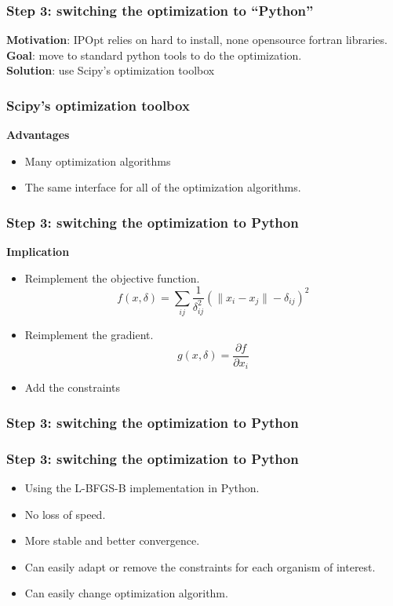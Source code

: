 \documentclass[xcolor=dvipsnames]{beamer}
\begin{document}
\begin{frame}
\frametitle{Step 3: switching the optimization to ``Python''}

{\bf \color{Blue} Motivation}: IPOpt relies on hard to install, none opensource
fortran libraries. 
\vspace{2em}
\\
{\bf \color{Blue} Goal}: move to standard python tools to do the optimization.
\vspace{2em}
\\
{\bf \color{Blue} Solution}: use Scipy's optimization toolbox 
\end{frame}

\begin{frame}
\frametitle{Scipy's optimization toolbox}

{\bf\color{Blue} Advantages} \\
\begin{itemize}[label={$\bullet$}]
\item Many optimization algorithms
\item The same interface for all of the optimization algorithms.
\end{itemize}

{

}
\end{frame}

\begin{frame}
\frametitle{Step 3: switching the optimization to Python}
{\bf\color{Blue} Implication}
\begin{itemize}[label={$\bullet$}]
\item Reimplement the objective function.
$$
f(x, \delta) = \underset{ij}{\sum}\frac{1}{\delta_{ij}^2} (\|x_i - x_j\| - \delta_{ij})^2
$$
\item Reimplement the gradient.
$$
g(x, \delta) = \frac{\partial f}{\partial x_i}
$$
\item Add the constraints
\end{itemize}
\end{frame}

\begin{frame}
\frametitle{Step 3: switching the optimization to Python}

{

}

\end{frame}

\begin{frame}
\frametitle{Step 3: switching the optimization to Python}

\begin{itemize}[label={$\bullet$}]
\item Using the L-BFGS-B implementation in Python.
\item No loss of speed.
\item More stable and better convergence.
\item Can easily adapt or remove the constraints for each organism of interest.
\item Can easily change optimization algorithm.
\end{itemize}
\end{frame}
\end{document}
